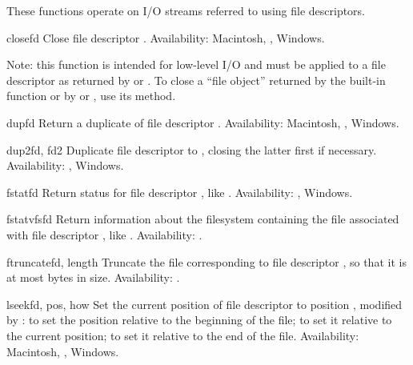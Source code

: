 These functions operate on I/O streams referred to
using file descriptors.


\begin{funcdesc}{close}{fd}
Close file descriptor .
Availability: Macintosh, \UNIX{}, Windows.

Note: this function is intended for low-level I/O and must be applied
to a file descriptor as returned by  or
.  To close a ``file object'' returned by the
built-in function  or by  or
, use its  method.
\end{funcdesc}

\begin{funcdesc}{dup}{fd}
Return a duplicate of file descriptor .
Availability: Macintosh, \UNIX{}, Windows.
\end{funcdesc}

\begin{funcdesc}{dup2}{fd, fd2}
Duplicate file descriptor  to , closing the latter
first if necessary.
Availability: \UNIX{}, Windows.
\end{funcdesc}

\begin{funcdesc}{fstat}{fd}
Return status for file descriptor , like .
Availability: \UNIX{}, Windows.
\end{funcdesc}

\begin{funcdesc}{fstatvfs}{fd}
Return information about the filesystem containing the file associated
with file descriptor , like .
Availability: \UNIX{}.
\end{funcdesc}

\begin{funcdesc}{ftruncate}{fd, length}
Truncate the file corresponding to file descriptor , 
so that it is at most  bytes in size.
Availability: \UNIX{}.
\end{funcdesc}

\begin{funcdesc}{lseek}{fd, pos, how}
Set the current position of file descriptor  to position
, modified by :  to set the position
relative to the beginning of the file;  to set it relative to
the current position;  to set it relative to the end of the
file.
Availability: Macintosh, \UNIX{}, Windows.
\end{funcdesc}

